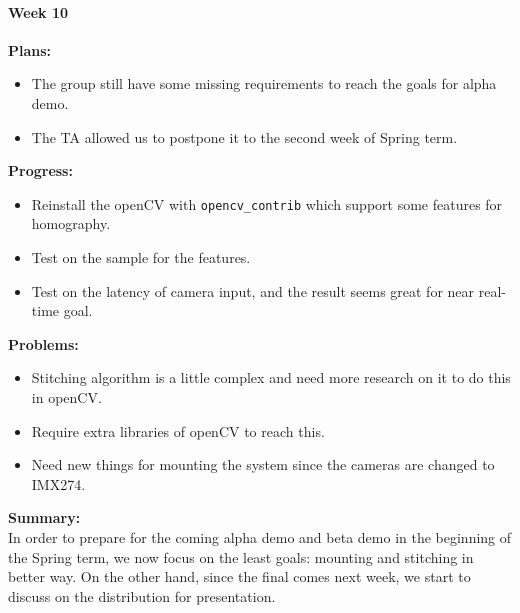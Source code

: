 \paragraph{Week 10}
\begin{adjustwidth}{2.5em}{0pt}
    \vspace{-0.5cm}\textbf{Plans:}
    \vspace{-0.5cm}
    \begin{itemize}
        \item The group still have some missing requirements to reach the goals for alpha demo.
        \item The TA allowed us to postpone it to the second week of Spring term.
    \end{itemize} 
    \vspace{-0.3cm}\textbf{Progress:}
    \vspace{-0.5cm}
    \begin{itemize}
        \item Reinstall the openCV with \texttt{opencv\_contrib} which support some features for homography.
        \item Test on the sample for the features.
        \item Test on the latency of camera input, and the result seems great for near real-time goal.
    \end{itemize} 
    \vspace{-0.3cm}\textbf{Problems:}
    \vspace{-0.5cm}
    \begin{itemize}
        \item Stitching algorithm is a little complex and need more research on it to do this in openCV.
        \item Require extra libraries of openCV to reach this.
        \item Need new things for mounting the system since the cameras are changed to IMX274.
    \end{itemize}  
    \vspace{-0.3cm}\noindent\textbf{Summary:}\\
    \noindent In order to prepare for the coming alpha demo and beta demo in the beginning of the Spring term,
     we now focus on the least goals: mounting and stitching in better way. On the other hand, since the final 
     comes next week, we start to discuss on the distribution for presentation. \\
\end{adjustwidth}

